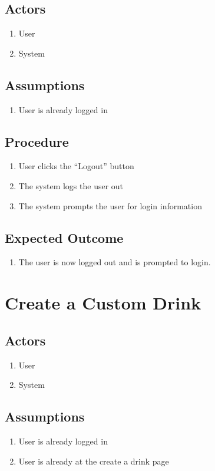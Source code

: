 {\subsection{Actors}
	\begin{enumerate}
    	\item User
		\item System
    \end{enumerate}
\subsection{Assumptions}
	\begin{enumerate}
    	\item User is already logged in
    \end{enumerate}
\subsection{Procedure}
   	\begin{enumerate}
    	\item User clicks the ``Logout'' button
    	\item The system logs the user out
    	\item The system prompts the user for login information
    \end{enumerate}
\subsection{Expected Outcome}
	\begin{enumerate}
    	\item The user is now logged out and is prompted to login.
    \end{enumerate}

\section{Create a Custom Drink}
\subsection{Actors}
	\begin{enumerate}
    	\item User
	    \item System
    \end{enumerate}
\subsection{Assumptions}
	\begin{enumerate}
    	\item User is already logged in
    	\item User is already at the create a drink page
    \end{enumerate}
}
